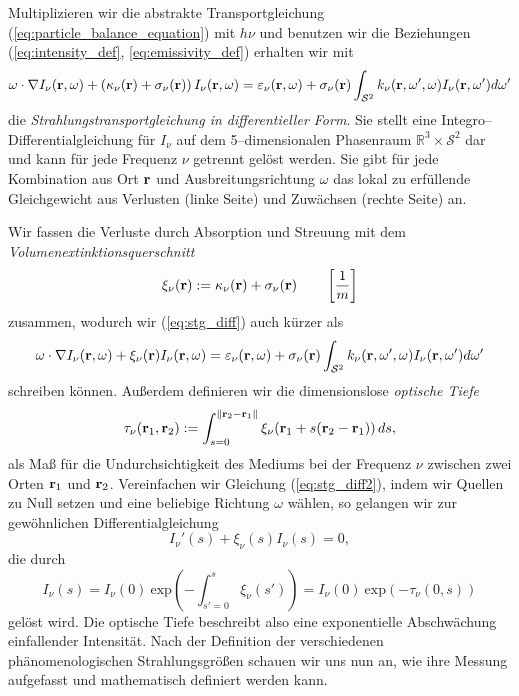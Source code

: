 	Multiplizieren wir die abstrakte Transportgleichung (\ref{eq:particle_balance_equation}) mit $h\nu$ und benutzen wir die Beziehungen (\ref{eq:intensity_def}, \ref{eq:emissivity_def}) erhalten wir mit
	\begin{equation}\label{eq:stg_diff}
	  \omega\cdot\nabla I_\nu(\mathbf{r},\omega)+\left(\kappa_\nu(\mathbf{r})+\sigma_\nu(\mathbf{r})\right)I_\nu(\mathbf{r},\omega)
	  =\varepsilon_\nu(\mathbf{r},\omega)+\sigma_\nu(\mathbf{r})\int_{\mathcal{S}^2}k_\nu(\mathbf{r},\omega',\omega)I_\nu(\mathbf{r},\omega')d\omega'
	\end{equation}
	die {\em Strahlungstransportgleichung in differentieller Form}. Sie stellt eine Integro--Differentialgleichung für $I_\nu$ auf dem 5--dimensionalen Phasenraum $\mathbb{R}^3 \times \mathcal{S}^2$ dar und kann für jede Frequenz $\nu$ getrennt gelöst werden. Sie gibt für jede Kombination aus Ort $\mathbf{r}$ und Ausbreitungsrichtung $\omega$ das lokal zu erfüllende Gleichgewicht aus Verlusten (linke Seite) und Zuwächsen (rechte Seite) an.
	
	Wir fassen die Verluste durch Absorption und Streuung mit dem {\em Vo\-lu\-men\-ex\-tink\-ti\-ons\-quer\-schnitt}
	$$\xi_\nu(\mathbf{r}):=\kappa_\nu(\mathbf{r})+\sigma_\nu(\mathbf{r}) \qquad\left[\frac{1}{m}\right]$$
	zusammen, wodurch wir (\ref{eq:stg_diff}) auch kürzer als
	\begin{equation}\label{eq:stg_diff2}
	  \omega\cdot\nabla I_\nu(\mathbf{r},\omega)+\xi_\nu(\mathbf{r})I_\nu(\mathbf{r},\omega)
	  =\varepsilon_\nu(\mathbf{r},\omega)+\sigma_\nu(\mathbf{r})\int_{\mathcal{S}^2}k_\nu(\mathbf{r},\omega',\omega)I_\nu(\mathbf{r},\omega')d\omega'
	\end{equation}
	schreiben können.
	Außerdem definieren wir die dimensionslose {\em optische Tiefe}
	\begin{equation*}
		\tau_\nu(\mathbf{r}_1,\mathbf{r}_2):=\int_{s=0}^{\|\mathbf{r}_2-\mathbf{r}_1\|} \xi_\nu(\mathbf{r}_1+s(\mathbf{r}_2 - \mathbf{r}_1))\,ds,
	\end{equation*}
	als Maß für die Undurchsichtigkeit des Mediums bei der Frequenz $\nu$ zwischen zwei Orten $\mathbf{r}_1$ und $\mathbf{r}_2$. Vereinfachen wir Gleichung (\ref{eq:stg_diff2}), indem wir Quellen zu Null setzen und eine beliebige Richtung $\omega$ wählen, so gelangen wir zur gewöhnlichen Differentialgleichung
	$$I_\nu'(s)+\xi_\nu(s)I_\nu(s)=0,$$
	die durch
	\begin{equation}
		I_\nu(s)=I_\nu(0)\:\text{exp}\left(-\int_{s'=0}^s \xi_\nu(s')\right)=I_\nu(0)\:\text{exp}\left(-\tau_\nu(0,s)\right)
		\label{eq:exponentialdecay}
	\end{equation}
	gelöst wird. Die optische Tiefe beschreibt also eine exponentielle Abschwächung einfallender Intensität. Nach der Definition der verschiedenen phänomenologischen Strahlungsgrößen schauen wir uns nun an, wie ihre Messung aufgefasst und mathematisch definiert werden kann.
	
